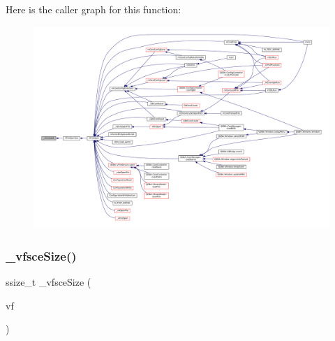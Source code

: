 Here is the caller graph for this function\+:
\nopagebreak
\begin{figure}[H]
\begin{center}
\leavevmode
\includegraphics[width=350pt]{sce-vfs_8c_a88279b263254e86a68f5ed9774606e64_icgraph}
\end{center}
\end{figure}
\mbox{\label{sce-vfs_8c_ab0da49443a78b59044b44713a9164452}} 
\subsubsection{\texorpdfstring{\+\_\+vfsce\+Size()}{\_vfsceSize()}}
{\footnotesize\ttfamily ssize\+\_\+t \+\_\+vfsce\+Size (\begin{DoxyParamCaption}\item[{struct V\+File $\ast$}]{vf }\end{DoxyParamCaption})\hspace{0.3cm}{\ttfamily [static]}}

